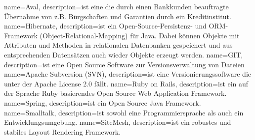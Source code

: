 {
  name=Aval,
  description={ist eine die durch einen Bankkunden beauftragte Übernahme von z.B. Bürgschaften und Garantien durch ein Kreditinstitut.
  }
}
{
  name=Hibernate,
  description={ist ein Open-Source-Persistenz- und ORM-Framework (Object-Relational-Mapping) für Java. Dabei können Objekte mit Attributen und Methoden in relationalen Datenbanken gespeichert und aus entsprechenden Datensätzen auch wieder Objekte erzeugt werden.
  }
}
{
  name=GIT,
  description={ist eine Open Source Software zur Versionsverwaltung von Dateien
  }
}
{
  name=Apache Subversion (SVN),
  description={ist eine Versionierungssoftware die unter der Apache License 2.0 fällt.
  }
}
{
  name=Ruby on Rails,
  description={ist ein auf der Sprache Ruby basierendes Open Source Web Application Framework.
  }
}
{
  name=Spring,
  description={ist ein Open Source Java Framework.
  }
}
{
  name=Smalltalk,
  description={ist sowohl eine Programmiersprache als auch ein Entwicklungsumgebung.
  }
}
{
  name=SiteMesh,
  description={ist ein robustes und stabiles Layout Rendering Framework.
  }
}

